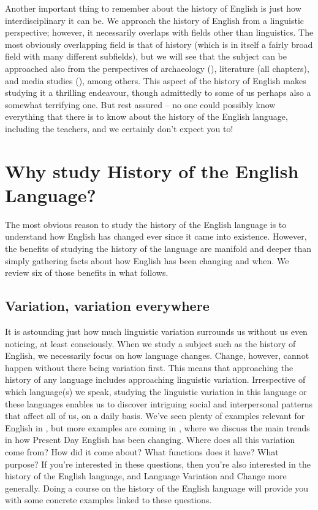 Another important thing to remember about the history of English is just how interdisciplinary it can be. We approach the history of English from a linguistic perspective; however, it necessarily overlaps with fields other than linguistics. The most obviously overlapping field is that of history (which is in itself a fairly broad field with many different subfields), but we will see that the subject can be approached also from the perspectives of archaeology (), literature (all chapters), and media studies (), among others. This aspect of the history of English makes studying it a thrilling endeavour, though admittedly to some of us perhaps also a somewhat terrifying one. But rest assured -- no one could possibly know everything that there is to know about the history of the English language, including the teachers, and we certainly don't expect you to!

\section{Why study History of the English Language?}
The most obvious reason to study the history of the English language is to understand how English has changed ever since it came into existence. However, the benefits of studying the history of the language are manifold and deeper than simply gathering facts about how English has been changing and when. We review six of those benefits in what follows.

\subsection{Variation, variation everywhere}\label{variation}
It is astounding just how much linguistic variation surrounds us without us even noticing, at least consciously. When we study a subject such as the history of English, we necessarily focus on how language changes. Change, however, cannot happen without there being variation first. This means that approaching the history of any language includes approaching linguistic variation. Irrespective of which language(s) we speak, studying the linguistic variation in this language or these languages enables us to discover intriguing social and interpersonal patterns that affect all of us, on a daily basis. We've seen plenty of examples relevant for English in , but more examples are coming in , where we discuss the main trends in how Present Day English has been changing. Where does all this variation come from? How did it come about? What functions does it have? What purpose? If you're interested in these questions, then you're also interested in the history of the English language, and Language Variation and Change more generally. Doing a course on the history of the English language will provide you with some concrete examples linked to these questions.

